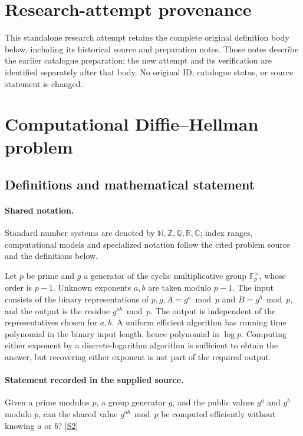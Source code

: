 \documentclass[11pt]{article}
\begin{document}
\section*{Research-attempt provenance}
This standalone research attempt retains the complete original definition body below,
including its historical source and preparation notes. Those notes describe the
earlier catalogue preparation; the new attempt and its verification are identified
separately after that body. No original ID, catalogue status, or source statement is changed.

\section{Computational Diffie–Hellman problem}\label{statement}

\subsection{Definitions and mathematical statement}

\paragraph{Shared notation.}Standard number systems are denoted by $\mathbb N,\mathbb Z,\mathbb Q,\mathbb R,\mathbb C$; index ranges, computational models and specialized notation follow the cited problem source and the definitions below.


Let $p$ be prime and $g$ a generator of the cyclic multiplicative group $\mathbb{F}_p^{\times}$, whose order is $p-1$. Unknown exponents $a,b$ are taken modulo $p-1$. The input consists of the binary representations of $p,g,A=g^a\bmod p$ and $B=g^b\bmod p$, and the output is the residue $g^{ab}\bmod p$. The output is independent of the representatives chosen for $a,b$. A uniform efficient algorithm has running time polynomial in the binary input length, hence polynomial in $\log p$. Computing either exponent by a discrete-logarithm algorithm is sufficient to obtain the answer, but recovering either exponent is not part of the required output.
\paragraph{Statement recorded in the supplied source.}
Given a prime modulus $p$, a group generator $g$, and the public values $g^a$ and $g^b$ modulo $p$, can the shared value $g^{ab}\bmod p$ be computed efficiently without knowing $a$ or $b$? \href{https://unsolvedproblems.org/index_files/DiffieHellman.htm}{[S2]}
\end{document}
